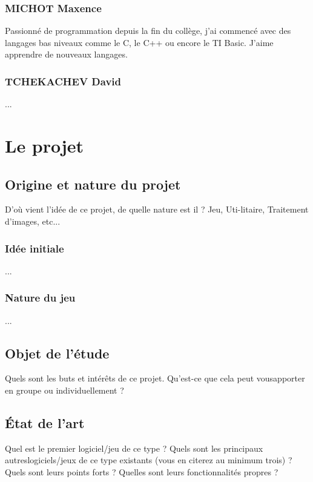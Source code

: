 \documentclass{article}
\begin{document}
\subsubsection{MICHOT Maxence}

Passionné de programmation depuis la fin du collège, j'ai commencé avec des langages bas niveaux comme le C, le C++ ou encore le TI Basic. J'aime apprendre de nouveaux langages.

\subsubsection{TCHEKACHEV David}

...

\pagebreak

\section{Le projet}

\subsection{Origine et nature du projet}

D’où vient l’idée de ce projet, de quelle nature est il ? Jeu, Uti-litaire, Traitement d’images, etc...

\subsubsection{Idée initiale}

...

\subsubsection{Nature du jeu}

...

\subsection{Objet de l'étude}

Quels sont les buts et intérêts de ce projet. Qu’est-ce que cela peut vousapporter en groupe ou individuellement ?

\subsection{État de l'art}

Quel est le premier logiciel/jeu de ce type ? Quels sont les principaux autreslogiciels/jeux de ce type existants (vous en citerez au minimum trois) ? Quels sont leurs points forts ? Quelles sont leurs fonctionnalités propres ?
\end{document}
